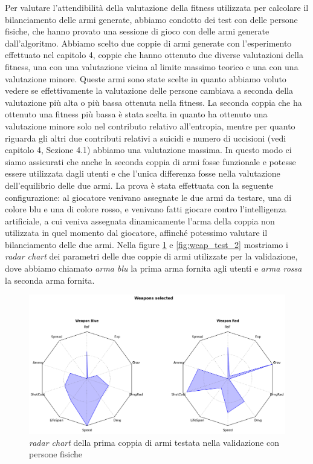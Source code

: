\documentclass[12pt, italian]{toptesi}
\begin{document}
Per valutare l'attendibilità della valutazione della fitness utilizzata per calcolare il bilanciamento delle armi generate, abbiamo condotto dei test con delle persone fisiche, che hanno provato una sessione di gioco con delle armi generate dall'algoritmo.
Abbiamo scelto due coppie di armi generate con l'esperimento effettuato nel capitolo 4, coppie che hanno ottenuto due diverse valutazioni della fitness, una con una valutazione vicina al limite massimo teorico e una con una valutazione minore.
Queste armi sono state scelte in quanto abbiamo voluto vedere se effettivamente la valutazione delle persone cambiava a seconda della valutazione più alta o più bassa ottenuta nella fitness.
La seconda coppia che ha ottenuto una fitness più bassa è stata scelta in quanto ha ottenuto una valutazione minore solo nel contributo relativo all'entropia, mentre per quanto riguarda gli altri due contributi relativi a suicidi e numero di uccisioni (vedi capitolo 4, Sezione 4.1) abbiamo una valutazione massima.
In questo modo ci siamo assicurati che anche la seconda coppia di armi fosse funzionale e potesse essere utilizzata dagli utenti e che l'unica differenza fosse nella valutazione dell'equilibrio delle due armi.
La prova è stata effettuata con la seguente configurazione: al giocatore venivano assegnate le due armi da testare, una di colore blu e una di colore rosso, e venivano fatti giocare contro l'intelligenza artificiale, a cui veniva assegnata dinamicamente l'arma della coppia non utilizzata in quel momento dal giocatore, affinché potessimo valutare il bilanciamento delle due armi. 
Nella figure \ref{fig:weap_test_1} e \ref{fig:weap_test_2} mostriamo i \emph{radar chart} dei parametri delle due coppie di armi utilizzate per la validazione, dove abbiamo chiamato \emph{arma blu} la prima arma fornita agli utenti e \emph{arma rossa} la seconda arma fornita.
\begin{figure}[htp]
\centering
\includegraphics[width=1.0\textwidth]{weap_test_1}
\caption{\emph{radar chart} della prima coppia di armi testata nella validazione con persone fisiche}
\label{fig:weap_test_1}
\end{figure}
\end{document}
